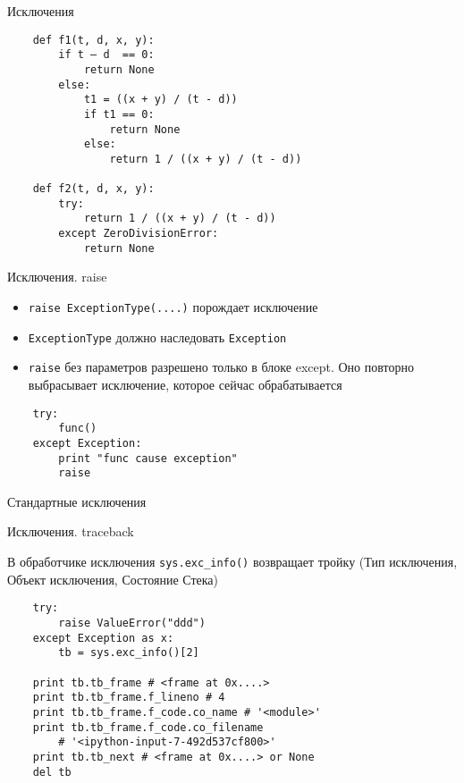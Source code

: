 \documentclass{article}
\begin{document}
\begin{center} Исключения \end{center}
\begin{lstlisting}
	def f1(t, d, x, y):
		if t – d  == 0:
		    return None
		else:
		    t1 = ((x + y) / (t - d))
		    if t1 == 0:
		        return None
		    else:
		        return 1 / ((x + y) / (t - d))

	def f2(t, d, x, y):
		try:
		    return 1 / ((x + y) / (t - d))
		except ZeroDivisionError:
		    return None
\end{lstlisting}
\newpage

\begin{center} Исключения. raise \end{center}
\begin{itemize}
	\item \lstinline!raise ExceptionType(....)! порождает исключение
	\item \lstinline!ExceptionType! должно наследовать \lstinline!Exception!
	\item \lstinline!raise! без параметров разрешено только в блоке except. 
		Оно повторно выбрасывает исключение, которое сейчас обрабатывается
\end{itemize}
\begin{lstlisting}
	try:
		func()
	except Exception:
		print "func cause exception"
		raise
\end{lstlisting}
\newpage

\begin{center} Стандартные исключения \end{center}
\newpage

\begin{center} Исключения. traceback \end{center}
	В обработчике исключения \lstinline!sys.exc_info()! возвращает тройку
		(Тип исключения, Объект исключения, Состояние Стека)
\begin{lstlisting}
	try:
	    raise ValueError("ddd")
	except Exception as x:
		tb = sys.exc_info()[2]

	print tb.tb_frame # <frame at 0x....>
	print tb.tb_frame.f_lineno # 4
	print tb.tb_frame.f_code.co_name # '<module>'
	print tb.tb_frame.f_code.co_filename 
		# '<ipython-input-7-492d537cf800>'
	print tb.tb_next # <frame at 0x....> or None
	del tb
\end{lstlisting}
\newpage
\end{document}
